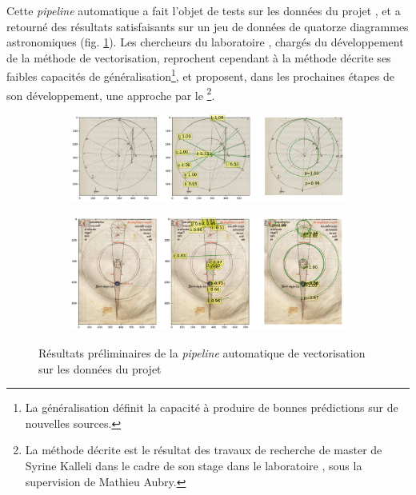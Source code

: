 	Cette \textit{pipeline} automatique a fait l'objet de tests sur les données du projet \eida, et a retourné des résultats satisfaisants sur un jeu de données de quatorze diagrammes astronomiques (fig. \ref{fig:imagine_vector}). Les chercheurs du laboratoire \imagine, chargés du développement de la méthode de vectorisation, reprochent cependant à la méthode décrite ses faibles capacités de généralisation\footnote{La généralisation définit la capacité à produire de bonnes prédictions sur de nouvelles sources.}, et proposent, dans les prochaines étapes de son développement, une approche par le \dl\footnote{La méthode décrite est le résultat des travaux de recherche de master de Syrine Kalleli dans le cadre de son stage dans le laboratoire \imagine, sous la supervision de Mathieu Aubry.}.
	
	\begin{figure}[h]
		\hspace{1pt}
		\begin{subfigure}{1\linewidth}
			\centering
			\includegraphics[width=16cm]{images/imagine_vector1.png}
		\end{subfigure}
		\hspace{1pt}
		\begin{subfigure}{1\linewidth}
			\centering
			\includegraphics[width=16cm]{images/imagine_vector2.png}
		\end{subfigure}
		\caption{Résultats préliminaires de la \textit{pipeline} automatique de vectorisation sur les données du projet \eida}
		\label{fig:imagine_vector}
	\end{figure}

